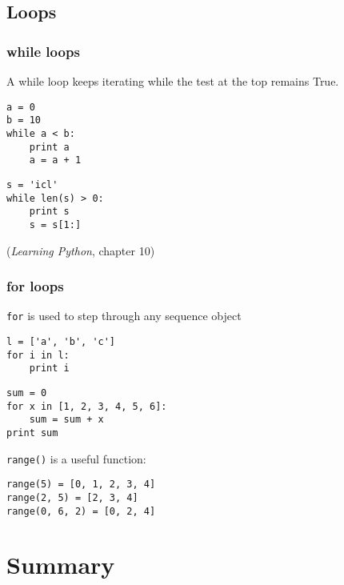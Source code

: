 \subsection{Loops}

\begin{frame}[fragile]
  \frametitle{while loops}

  A while loop keeps iterating while the test at the top remains True.

{\small
\begin{verbatim}
a = 0
b = 10
while a < b:
    print a
    a = a + 1
\end{verbatim}
  \pause
\begin{verbatim}
s = 'icl'
while len(s) > 0:
    print s
    s = s[1:]
\end{verbatim}}
    (\emph{Learning Python}, chapter 10)    
\end{frame}

\begin{frame}[fragile]
  \frametitle{for loops}

  \texttt{for} is used to step through any sequence object
{\small
\begin{verbatim}
l = ['a', 'b', 'c']
for i in l:
    print i
\end{verbatim}}
  \pause
{\small
\begin{verbatim}
sum = 0
for x in [1, 2, 3, 4, 5, 6]:
    sum = sum + x
print sum
\end{verbatim}}
  \pause
\texttt{range()} is a useful function:
{\small
\begin{verbatim}
range(5) = [0, 1, 2, 3, 4]
range(2, 5) = [2, 3, 4]
range(0, 6, 2) = [0, 2, 4]
\end{verbatim}}
\end{frame}

\section{Summary}


